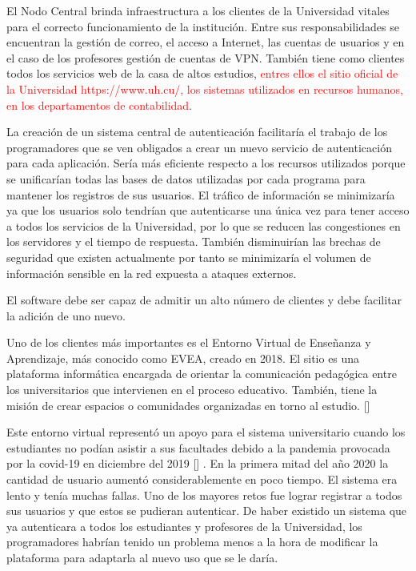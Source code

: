 El Nodo Central brinda infraestructura a los clientes de la Universidad vitales para el correcto funcionamiento de la institución. Entre sus responsabilidades se encuentran la gestión de correo, el acceso a Internet, las cuentas de usuarios y en el caso de los profesores gestión de cuentas de VPN. También tiene como clientes todos los servicios web de la casa de altos estudios, \textcolor{red}{entres ellos el sitio oficial de la Universidad https://www.uh.cu/, los sistemas utilizados en recursos humanos, en los departamentos de contabilidad}.

La creación de un sistema central de autenticación facilitaría el trabajo de los programadores que se ven obligados a crear un nuevo servicio de autenticación para cada aplicación. Sería más eficiente respecto a los recursos utilizados porque se unificarían todas las bases de datos utilizadas por cada programa para mantener los registros de sus usuarios. El tráfico de información se minimizaría ya que los usuarios solo tendrían que autenticarse una única vez para tener acceso a todos los servicios de la Universidad, por lo que se reducen las congestiones en los servidores y el tiempo de respuesta. También disminuirían las brechas de seguridad que existen actualmente por tanto se minimizaría el volumen de información sensible en la red expuesta a ataques externos.

El software debe ser capaz de admitir un alto número de clientes y debe facilitar la adición de uno nuevo.

Uno de los clientes más importantes es el Entorno Virtual de Enseñanza y Aprendizaje, más conocido como EVEA, creado en 2018. El sitio es una plataforma informática encargada de orientar la comunicación pedagógica entre los universitarios que intervienen en el proceso educativo. También, tiene la misión de crear espacios o comunidades organizadas en torno al estudio. [\cite{evea-cd}] 

Este entorno virtual representó un apoyo para el sistema universitario cuando los estudiantes no podían asistir a sus facultades debido a la pandemia provocada por la covid-19 en diciembre del 2019 [\cite{ferrer2020pandemia}] . En la primera mitad del año 2020 la cantidad de usuario aumentó considerablemente en poco tiempo. El sistema era lento y tenía muchas fallas. Uno de los mayores retos fue lograr registrar a todos sus usuarios y que estos se pudieran autenticar. De haber existido un sistema que ya autenticara a todos los estudiantes y profesores de la Universidad, los programadores habrían tenido un problema menos a la hora de modificar la plataforma para adaptarla al nuevo uso que se le daría.


